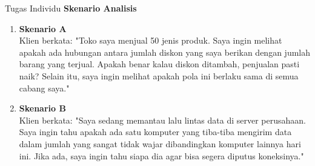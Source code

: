 \documentclass[t]{beamer}
\begin{document}
\begin{frame}{Tugas Individu}
\textbf{Skenario Analisis}

\begin{enumerate}
    \item \textbf{Skenario A} \\
    Klien berkata: "Toko saya menjual 50 jenis produk. Saya ingin melihat apakah ada hubungan antara jumlah diskon yang saya berikan dengan jumlah barang yang terjual. Apakah benar kalau diskon ditambah, penjualan pasti naik? Selain itu, saya ingin melihat apakah pola ini berlaku sama di semua cabang saya."
     \item \textbf{Skenario B} \\
     Klien berkata: "Saya sedang memantau lalu lintas data di server perusahaan. Saya ingin tahu apakah ada satu komputer yang tiba-tiba mengirim data dalam jumlah yang sangat tidak wajar dibandingkan komputer lainnya hari ini. Jika ada, saya ingin tahu siapa dia agar bisa segera diputus koneksinya."

\end{enumerate}
\end{frame}
\end{document}
